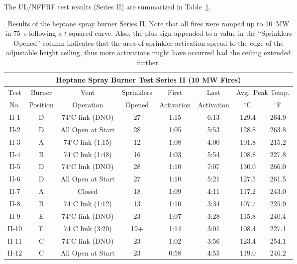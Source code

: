 \clearpage

The UL/NFPRF test results (Series II) are summarized in Table~\ref{ULburnermatrixII}.

\begin{table}[ht!]
\begin{center}
\begin{tabular}{|c||c|c|c|c|c|c|c|}
\hline
\multicolumn{8}{|c|}{\bf Heptane Spray Burner Test Series II (10 MW Fires)}\\ \hline \hline
Test & Burner   & Vent      & Sprinklers & First      & Last      & \multicolumn{2}{|c|}{Avg.~Peak Temp.} \\ \cline{7-8}
No.  & Position & Operation & Opened     & Activation & Activation & $^\circ$C & $^\circ$F   \\
\hline \hline
II-1  & D  & 74$^\circ$C link (DNO)  & 27 & 1:15 & 6:13 & 129.4 &264.9 \\ \hline
II-2  & D  & All Open at Start       & 28 & 1:05 & 5:53 & 128.8 &263.8 \\ \hline
II-3  & A  & 74$^\circ$C link (1:15) & 12 & 1:08 & 4:00 & 101.8 &215.2 \\ \hline
II-4  & B  & 74$^\circ$C link (1:48) & 16 & 1:03 & 5:54 & 108.8 &227.8 \\ \hline
II-5  & D  & 74$^\circ$C link (DNO)  & 28 & 1:10 & 7:07 & 130.0 &266.0 \\ \hline
II-6  & D  & All Open at Start       & 27 & 1:10 & 5:21 & 127.5 &261.5 \\ \hline
II-7  & A  & Closed                  & 18 & 1:09 & 4:11 & 117.2 &243.0 \\ \hline
II-8  & B  & 74$^\circ$C link (1:12) & 13 & 1:10 & 3:34 & 107.7 &225.9 \\ \hline
II-9  & E  & 74$^\circ$C link (DNO)  & 23 & 1:07 & 3:28 & 115.8 &240.4 \\ \hline
II-10 & F  & 74$^\circ$C link (3:20) & 19+& 1:14 & 3:01 & 108.4 &227.1 \\ \hline
II-11 & C  & 74$^\circ$C link (DNO)  & 23 & 1:02 & 3:56 & 123.4 &254.1 \\ \hline
II-12 & C  & All Open at Start       & 23 & 0:58 & 4:55 & 119.0 &246.2 \\ \hline
\end{tabular}
\end{center}
\caption[Results of the UL/NFPRF Experiments, Series~II.]
{Results of the heptane spray burner Series II. Note that all fires
were ramped up to 10~MW in 75~s following a $t$-squared curve. Also, the
plus sign appended to a value in the ``Sprinklers Opened''
column indicates that the area of sprinkler activation spread to the
edge of the adjustable height ceiling, thus more activations might have
occurred had the ceiling extended further.}
\label{ULburnermatrixII}
\end{table}

